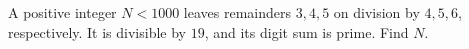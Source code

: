 A positive integer $N<1000$ leaves remainders $3,4,5$ on division by $4,5,6$, respectively. It is divisible by $19$, and its digit sum is prime. Find $N$.
